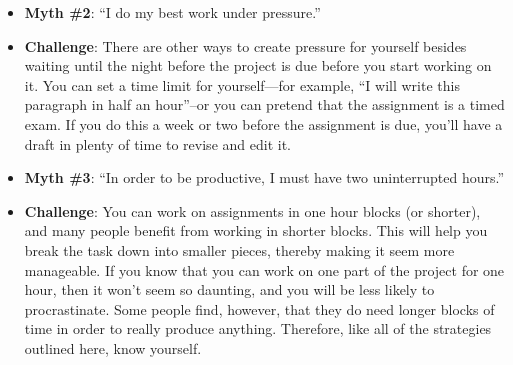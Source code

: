\documentclass[../main.tex]{subfiles}
\begin{document}
\begin{cuenotes}
{\begin{itemize}
        other words, procrastinating.
      \item \textbf{Myth \#2}: ``I do my best work under pressure.''
      \item \textbf{Challenge}: There are other ways to create pressure for
        yourself besides waiting until the night before the project is due
        before you start working on it. You can set a time limit for
        yourself—for example, ``I will write this paragraph in half an hour''–or
        you can pretend that the assignment is a timed exam. If you do this a
        week or two before the assignment is due, you'll have a draft in plenty
        of time to revise and edit it.
      \item \textbf{Myth \#3}: ``In order to be productive, I must have two uninterrupted
        hours.''
      \item \textbf{Challenge}: You can work on assignments in one hour blocks
        (or shorter), and many people benefit from working in shorter blocks.
        This will help you break the task down into smaller pieces, thereby
        making it seem more manageable. If you know that you can work on one
        part of the project for one hour, then it won't seem so daunting, and
        you will be less likely to procrastinate. Some people find, however,
        that they do need longer blocks of time in order to really produce
        anything. Therefore, like all of the strategies outlined here, know
        yourself.
    \end{itemize}
  }
  \note{
}
\end{cuenotes}
\end{document}
